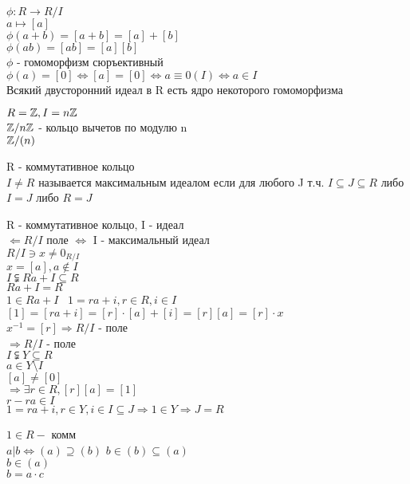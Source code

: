 $ \phi : R \rightarrow R / I $ \\
$ a \mapsto [a] $ \\
$ \phi(a + b) = [a+b] = [a] + [b] $\\
$ \phi(ab) = [ab] = [a][b] $\\
$ \phi $ - гомоморфизм сюръективный \\
$ \phi(a) = [0]  \Leftrightarrow [a] = [0] \Leftrightarrow a \equiv 0(I) \Leftrightarrow a \in I $\\
Всякий двусторонний идеал в R есть ядро некоторого гомоморфизма \\
\begin{definition}
	$ R = \mathbb{Z}, I = n\mathbb{Z} $ \\
	$ \mathbb{Z} / n\mathbb{Z} $ - кольцо вычетов по модулю n\\
	$ \mathbb{Z} / (n) $
\end{definition}


R - коммутативное кольцо \\
$ I \neq R $ называется максимальным идеалом если для любого J т.ч. $ I \subseteq J \subseteq R $ либо $ I = J $ либо $ R = J $ \\
\begin{theorem}
	R - коммутативное кольцо, I - идеал \\
	$ \Leftarrow R / I $ поле $ \Leftrightarrow $ I - максимальный идеал \\
	$ R / I \ni x \neq 0_{R /I} $ \\
	$ x = [a], a \notin I $ \\
	$ I \subsetneqq Ra + I \subseteq R $\\
	$ Ra + I = R $ \\
	$ 1 \in Ra + I $ \
	$ 1 = ra + i, r \in R, i \in I $\\
	$ [1] = [ra + i] = [r] \cdot [a] + [i] = [r][a] = [r]\cdot x $\\
	$ x^{-1}  = [r] \Rightarrow R / I $ - поле \\
	$ \Rightarrow R / I $ - поле \\
	$ I \subsetneqq Y \subseteq R $ \\
	$ a \in Y \setminus I $ \\
	$ [a] \neq [0] $ \\
	$ \Rightarrow \exists r \in R, [r] [a] = [1] $ \\
	$ r - ra \in I $ \\
	$ 1 = ra + i, r \in Y, i \in I \subseteq J \Rightarrow 1 \in Y  \Rightarrow J = R $ 
\end{theorem}
 
 $ 1 \in R - $ комм \\
 $ a | b \Leftrightarrow (a) \supseteq (b) $ 
 $ b \in (b) \subseteq (a) $ \\
 $ b \in (a) $ \\
 $ b = a \cdot c $ 








   